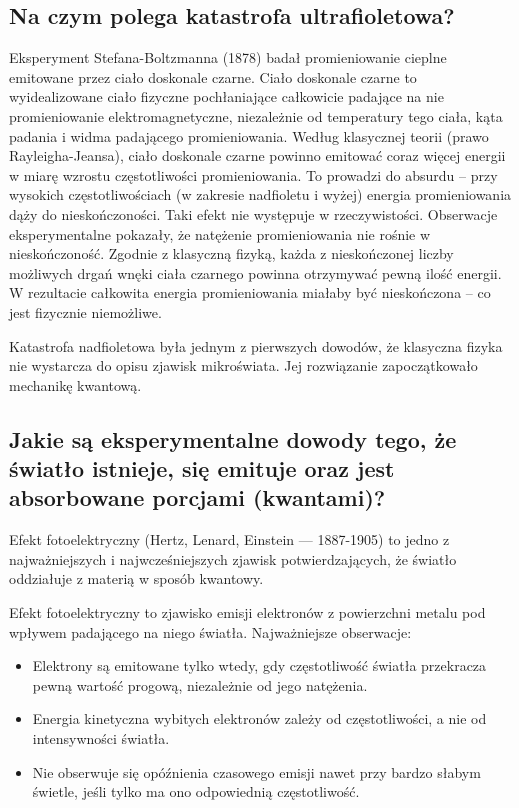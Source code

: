\subsection{Na czym polega katastrofa ultrafioletowa?}

Eksperyment Stefana-Boltzmanna (1878) badał promieniowanie cieplne emitowane przez
ciało doskonale czarne. Ciało doskonale czarne to wyidealizowane ciało fizyczne pochłaniające całkowicie padające na nie promieniowanie elektromagnetyczne, niezależnie od temperatury tego ciała, kąta padania i widma padającego promieniowania. Według klasycznej teorii (prawo Rayleigha-Jeansa), ciało doskonale czarne powinno emitować coraz więcej energii w miarę wzrostu częstotliwości promieniowania. To prowadzi do absurdu – przy wysokich częstotliwościach (w zakresie nadfioletu i wyżej) energia promieniowania dąży do nieskończoności. Taki efekt nie występuje w rzeczywistości. Obserwacje eksperymentalne pokazały, że natężenie promieniowania nie rośnie w nieskończoność. Zgodnie z klasyczną fizyką, każda z nieskończonej liczby możliwych drgań wnęki ciała czarnego powinna otrzymywać pewną ilość energii. W rezultacie całkowita energia promieniowania miałaby być nieskończona – co jest fizycznie niemożliwe.

Katastrofa nadfioletowa była jednym z pierwszych dowodów, że klasyczna fizyka nie wystarcza do opisu zjawisk mikroświata. Jej rozwiązanie zapoczątkowało mechanikę kwantową.

\subsection{Jakie są eksperymentalne dowody tego, że światło istnieje, się emituje oraz jest absorbowane porcjami (kwantami)?}

Efekt fotoelektryczny (Hertz, Lenard, Einstein --- 1887-1905) to jedno z najważniejszych i najwcześniejszych zjawisk potwierdzających, że światło oddziałuje z materią w sposób kwantowy. 

Efekt fotoelektryczny to zjawisko emisji elektronów z powierzchni metalu pod wpływem padającego na niego światła. Najważniejsze obserwacje:
\begin{itemize}
\item Elektrony są emitowane tylko wtedy, gdy częstotliwość światła przekracza pewną wartość progową, niezależnie od jego natężenia. 
\item Energia kinetyczna wybitych elektronów zależy od częstotliwości, a nie od intensywności światła.
\item Nie obserwuje się opóźnienia czasowego emisji nawet przy bardzo słabym świetle, jeśli tylko ma ono odpowiednią częstotliwość.
\end{itemize}

